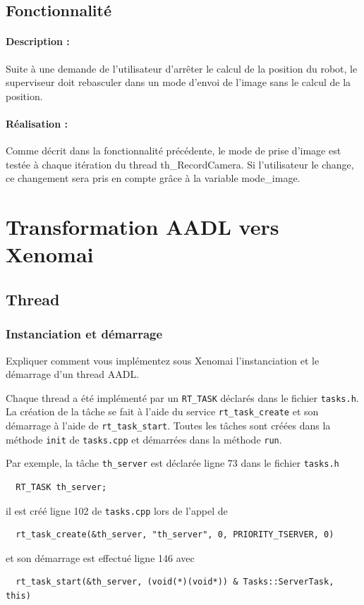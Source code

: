 \documentclass[11pt, a4paper]{paper}
\newcounter{cptreq}
\begin{document}
{{\subsection{Fonctionnalité \thecptreq}

\paragraph{Description :} Suite à une demande de l'utilisateur d'arrêter le calcul de la position du robot, le superviseur doit rebasculer dans un mode d'envoi de l'image sans le calcul de la position.

\paragraph{\color{black}Réalisation :}  {\color{black} Comme décrit dans la fonctionnalité précédente, le mode de prise d'image est testée à chaque itération du thread th\_RecordCamera. Si l'utilisateur le change, ce changement sera pris en compte grâce à la variable mode\_image. }


\section{Transformation AADL vers Xenomai}
 
\subsection{Thread}
\subsubsection{Instanciation et démarrage}
 {\color{blue} Expliquer comment vous implémentez sous Xenomai l'instanciation et le démarrage d'un  thread AADL.}
 
 {\color{black} {Chaque thread a été implémenté par un {\tt RT\_TASK} déclarés dans le fichier {\tt tasks.h}. La création de la tâche se fait à l'aide du service {\tt rt\_task\_create} et son démarrage à l'aide de {\tt rt\_task\_start}. Toutes les tâches sont créées dans la méthode {\tt init} de {\tt tasks.cpp} et démarrées dans la méthode {\tt run}.

Par exemple, la tâche {\tt th\_server} est déclarée ligne 73 dans le fichier {\tt tasks.h}
\begin{verbatim}
  RT_TASK th_server;
\end{verbatim}
 il est créé ligne 102 de {\tt tasks.cpp} lors de l'appel de
\begin{verbatim}
  rt_task_create(&th_server, "th_server", 0, PRIORITY_TSERVER, 0)
\end{verbatim}
et son démarrage est effectué ligne 146 avec
\begin{verbatim}
  rt_task_start(&th_server, (void(*)(void*)) & Tasks::ServerTask, this)
\end{verbatim}
}

}}}
\end{document}
